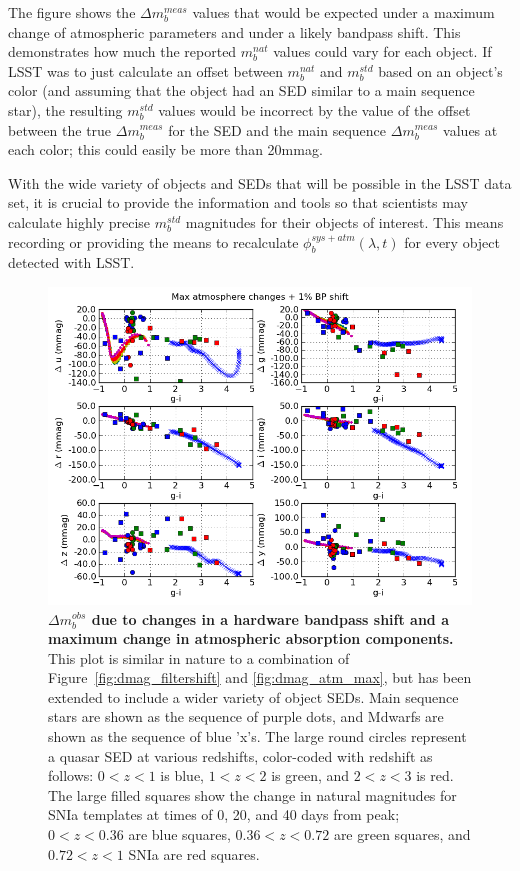 \documentclass[12pt,preprint]{aastex}
\begin{document}
The figure shows the $\Delta m_b^{meas}$ values that would be expected
under a maximum change of atmospheric parameters and under a likely
bandpass shift. This demonstrates how much the reported $m_b^{nat}$
values could vary for each object. If LSST was to just calculate an
offset between $m_b^{nat}$ and $m_b^{std}$ based on an object's color
(and assuming that the object had an SED similar to a main sequence
star), the resulting $m_b^{std}$ values would be incorrect by the
value of the offset between the true $\Delta m_b^{meas}$ for the SED
and the main sequence $\Delta m_b^{meas}$ values at each color; this
could easily be more than 20mmag.  

With the wide variety of objects and SEDs that will be possible in the
LSST data set, it is crucial to provide the information and tools so that
scientists may calculate highly precise $m_b^{std}$ magnitudes for
their objects of interest. This means recording or providing the means
to recalculate $\phi_b^{sys+atm}(\lambda,t)$ for every object detected
with LSST. 

\begin{figure}
\centering
\includegraphics[width=6in]{dmag_all_max+shift}
\caption{{\small
{\bf $\Delta m_b^{obs}$ due to changes in a hardware bandpass shift
  and a maximum change in atmospheric absorption components.}  This
plot is similar in nature to a combination of
Figure~\ref{fig:dmag_filtershift} and \ref{fig:dmag_atm_max}, but has
been extended to include a wider variety of object SEDs. Main sequence
stars are shown as the sequence of purple dots, and Mdwarfs are
shown as the sequence of blue 'x's. The large round circles represent
a quasar SED at various redshifts, color-coded with redshift as
follows: $0<z<1$ is blue, $1<z<2$ is green, and $2<z<3$ is red. The
large filled squares show the change in natural magnitudes for SNIa
templates at times of 0, 20, and 40 days from peak; $0<z<0.36$ are
blue squares, $0.36<z<0.72$ are green squares, and $0.72<z<1$ SNIa are
red squares. 
}}
\label{fig:dmag_allseds}
\end{figure}
\end{document}
